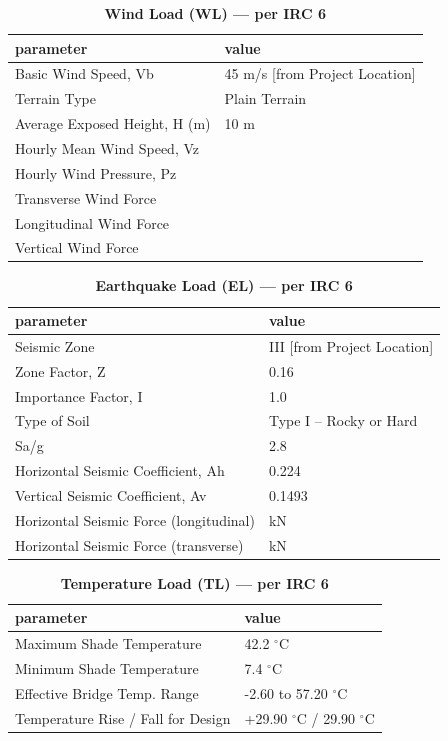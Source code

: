 \documentclass[12pt,a4paper]{report}
\numberwithin{table}{chapter}
\numberwithin{figure}{chapter}
\begin{document}
\vspace{1em}
\begin{longtable}{|L{5.5cm}|p{10.0cm}|}
\caption{\textbf{Wind Load (WL) --- per IRC 6}}
\hline
\textbf{parameter} & \textbf{value} \\
\hline
\textnormal{Basic Wind Speed, Vb} & 45 m/s [from Project Location] \\[6pt]
\hline
\textnormal{Terrain Type} & Plain Terrain \\[6pt]
\hline
\textnormal{Average Exposed Height, H (m)} & 10 m \\[6pt]
\hline
\textnormal{Hourly Mean Wind Speed, Vz} &  \\[6pt]
\hline
\textnormal{Hourly Wind Pressure, Pz} &  \\[6pt]
\hline
\textnormal{Transverse Wind Force} &  \\[6pt]
\hline
\textnormal{Longitudinal Wind Force} &  \\[6pt]
\hline
\textnormal{Vertical Wind Force} &  \\[6pt]
\hline
\end{longtable}

\vspace{1em}
\begin{longtable}{|L{5.5cm}|p{10.0cm}|}
\caption{\textbf{Earthquake Load (EL) --- per IRC 6}}
\hline
\textbf{parameter} & \textbf{value} \\
\hline
\textnormal{Seismic Zone} & III [from Project Location] \\[6pt]
\hline
\textnormal{Zone Factor, Z} & 0.16 \\[6pt]
\hline
\textnormal{Importance Factor, I} & 1.0 \\[6pt]
\hline
\textnormal{Type of Soil} & Type I – Rocky or Hard \\[6pt]
\hline
\textnormal{Sa/g} & 2.8 \\[6pt]
\hline
\textnormal{Horizontal Seismic Coefficient, Ah} & 0.224 \\[6pt]
\hline
\textnormal{Vertical Seismic Coefficient, Av} & 0.1493 \\[6pt]
\hline
\textnormal{Horizontal Seismic Force (longitudinal)} &  kN \\[6pt]
\hline
\textnormal{Horizontal Seismic Force (transverse)} &  kN \\[6pt]
\hline
\end{longtable}

\vspace{1em}
\begin{longtable}{|L{5.5cm}|p{10.0cm}|}
\caption{\textbf{Temperature Load (TL) --- per IRC 6}}
\hline
\textbf{parameter} & \textbf{value} \\
\hline
\textnormal{Maximum Shade Temperature} & 42.2 $^\circ$C \\[6pt]
\hline
\textnormal{Minimum Shade Temperature} & 7.4 $^\circ$C \\[6pt]
\hline
\textnormal{Effective Bridge Temp. Range} & -2.60 to 57.20 $^\circ$C \\[6pt]
\hline
\textnormal{Temperature Rise / Fall for Design} & +29.90 $^\circ$C / \textminus{}29.90 $^\circ$C \\[6pt]
\hline
\end{longtable}
\end{document}
